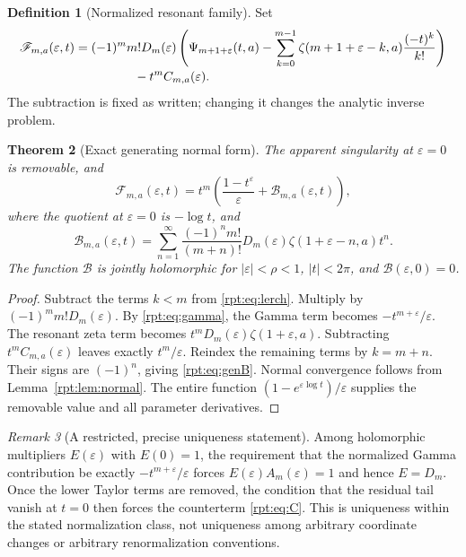 \documentclass[11pt,a4paper]{article}
\numberwithin{equation}{section}
\newtheorem{theorem}{Theorem}[section]
\theoremstyle{definition}\newtheorem{definition}[theorem]{Definition}
\theoremstyle{remark}\newtheorem{remark}[theorem]{Remark}
\newcommand{\eps}{\varepsilon}
\newcommand{\calF}{\mathscr F}
\newcommand{\calB}{\mathscr B}
\begin{document}
\begin{definition}[Normalized resonant family]
\label{rpt:def:F}
Set
\begin{align}
\calF_{m,a}(\eps,t)
={}&(-1)^m m!D_m(\eps)
 \left(\Psi_{m+1+\eps}(t,a)
 -\sum_{k=0}^{m-1}\zeta(m+1+\eps-k,a)\frac{(-t)^k}{k!}\right)
\notag\\[-2pt]
&\hspace{12mm}-t^m C_{m,a}(\eps).
\label{rpt:eq:Fdef}
\end{align}
The subtraction is fixed as written; changing it changes the analytic inverse problem.
\end{definition}

\begin{theorem}[Exact generating normal form]
\label{rpt:thm:family}
The apparent singularity at $\eps=0$ is removable, and
\begin{equation}
\boxed{\quad
\calF_{m,a}(\eps,t)=t^m\left(\frac{1-t^\eps}{\eps}
+\calB_{m,a}(\eps,t)\right),\quad}
\label{rpt:eq:family}
\end{equation}
where the quotient at $\eps=0$ is $-\log t$, and
\begin{equation}
\calB_{m,a}(\eps,t)=\sum_{n=1}^{\infty}
\frac{(-1)^n m!}{(m+n)!}
D_m(\eps)\zeta(1+\eps-n,a)t^n.
\label{rpt:eq:genB}
\end{equation}
The function $\calB$ is jointly holomorphic for $|\eps|<\rho<1$, $|t|<2\pi$, and $\calB(\eps,0)=0$.
\end{theorem}
\begin{proof}
Subtract the terms $k<m$ from \eqref{rpt:eq:lerch}. Multiply by $(-1)^m m!D_m(\eps)$. By \eqref{rpt:eq:gamma}, the Gamma term becomes $-t^{m+\eps}/\eps$. The resonant zeta term becomes $t^mD_m(\eps)\zeta(1+\eps,a)$. Subtracting $t^mC_{m,a}(\eps)$ leaves exactly $t^m/\eps$. Reindex the remaining terms by $k=m+n$. Their signs are $(-1)^n$, giving \eqref{rpt:eq:genB}. Normal convergence follows from Lemma~\ref{rpt:lem:normal}. The entire function $(1-e^{\eps\log t})/\eps$ supplies the removable value and all parameter derivatives.
\end{proof}

\begin{remark}[A restricted, precise uniqueness statement]
Among holomorphic multipliers $E(\eps)$ with $E(0)=1$, the requirement that the normalized Gamma contribution be exactly $-t^{m+\eps}/\eps$ forces $E(\eps)A_m(\eps)=1$ and hence $E=D_m$. Once the lower Taylor terms are removed, the condition that the residual tail vanish at $t=0$ then forces the counterterm \eqref{rpt:eq:C}. This is uniqueness within the stated normalization class, not uniqueness among arbitrary coordinate changes or arbitrary renormalization conventions.
\end{remark}
\end{document}
